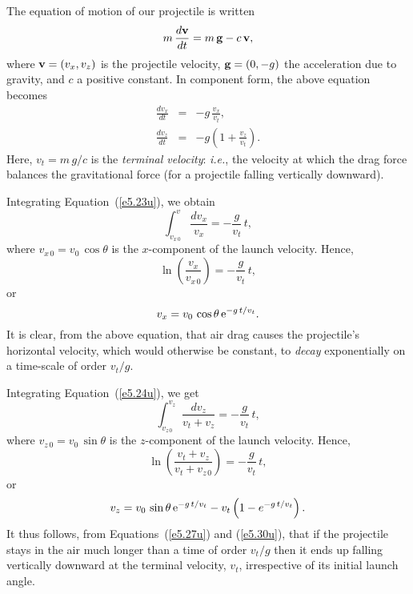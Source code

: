 The equation of motion of our projectile is written
\begin{equation}
m\,\frac{d{\bf v}}{dt} = m\,{\bf g} - c\,{\bf v},
\end{equation}
where ${\bf v} = (v_x, v_z)$ is the projectile velocity,
${\bf g} = (0, -g)$ the acceleration due to gravity, and
$c$ a positive constant. In component form, the
above equation becomes
\begin{eqnarray}
\frac{dv_x}{dt} &=& - g\,\frac{v_x}{v_t},\label{e5.23u}\\[0.5ex]
\frac{d v_z}{dt} &=& - g\left(1+\frac{v_z}{v_t}\right).\label{e5.24u}
\end{eqnarray}
Here, $v_t = m\,g/c$ is the {\em terminal velocity}: {\em i.e.}, the
velocity at which the drag force balances the gravitational force (for a
projectile falling vertically downward).

Integrating Equation~(\ref{e5.23u}), we obtain
\begin{equation}
\int_{v_{x\,0}}^v\frac{dv_x}{v_x} = - \frac{g}{v_t}\,t,
\end{equation}
where $v_{x\,0} = v_0\,\cos\theta$ is the $x$-component of the
launch velocity. 
Hence,
\begin{equation}
\ln\left(\frac{v_x}{v_{x\,0}}\right) = - \frac{g}{v_t}\,t,
\end{equation}
or
\begin{equation}\label{e5.27u}
v_x = v_0\,\cos\theta\,{\rm e}^{-g\,t/v_t}.
\end{equation}
It is clear, from the above equation, that air drag causes the  projectile's horizontal
velocity, which would otherwise be constant, to {\em decay}\/ exponentially on a time-scale of order $v_t/g$.

Integrating Equation~(\ref{e5.24u}), we get
\begin{equation}
\int_{v_{z\,0}}^{v_z} \frac{dv_z}{v_t+v_z} = - \frac{g}{v_t}\,t,
\end{equation}
where $v_{z\,0}=v_0\,\sin\theta$ is the $z$-component of the launch velocity. Hence,
\begin{equation}
\ln\left(\frac{v_t+v_z}{v_t+v_{z\,0}}\right) = - \frac{g}{v_t}\,t,
\end{equation}
or
\begin{equation}\label{e5.30u}
v_z = v_0\,\sin\theta\,{\rm e}^{-g\,t/v_t} - v_t\left(1-e^{-g\,t/v_t}\right).
\end{equation}
It thus follows, from Equations~(\ref{e5.27u}) and (\ref{e5.30u}), that if the
projectile stays in the air much longer than a time of order $v_t/g$ then
it ends up falling vertically downward at the terminal velocity, $v_t$, irrespective
of its initial launch angle.

